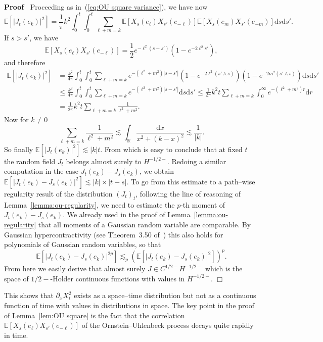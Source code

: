 \documentclass[a4paper,11pt]{article}
\newcommand{\mathd}{\mathrm{d}}
\newenvironment{proof}{\noindent\textbf{Proof\ }}{\hspace*{\fill}$\Box$\medskip}
\begin{document}
\begin{proof}
  Proceeding as in~(\ref{eq:OU square variance}), we have now
  \[ \mathbb{E} [| J_t (e_k) |^2] = \frac{1}{\pi} k^2 \int_0^t \int_0^t \sum_{\ell + m =
     k} \mathbb{E} [X_s (e_{\ell}) X_{s'} (e_{- \ell})] \mathbb{E} [X_s
     (e_m) X_{s'} (e_{- m})] \mathd s \mathd s' . \]
  If $s > s'$, we have
  \[ \mathbb{E} [X_s (e_{\ell}) X_{s'} (e_{- \ell})] = \frac{1}{2} e^{-
     \ell^2 (s - s')} (1 - e^{- 2 \ell^2 s'}), \]
  and therefore
  \begin{align*}
     \mathbb{E} [| J_t (e_k) |^2] & = \frac{k^2}{4\pi} \int_0^t \int_0^t \sum_{\ell + m = k} e^{- (\ell^2 + m^2) | s - s' |} (1 - e^{- 2 \ell^2(s' \wedge s)}) (1 - e^{- 2 m^2 (s' \wedge s)}) \mathd s \mathd s' \\
      & \leqslant \frac{k^2}{4\pi} \int_0^t \int_0^t \sum_{\ell + m = k} e^{-(\ell^2 + m^2) | s - s' |} \mathd s \mathd s' \leqslant \frac{1}{2\pi} k^2 t \sum_{\ell + m = k} \int_0^{\infty} e^{- (\ell^2 + m^2) r} \mathd r  \\
      & = \frac{1}{2\pi} k^2 t \sum_{\ell + m = k} \frac{1}{\ell^2 + m^2}.
  \end{align*}
  Now for $k \neq 0$
  \[ \sum_{\ell + m = k} \frac{1}{\ell^2 + m^2} \lesssim \int_{\mathbb{R}}
     \frac{\mathd x}{x^2 + (k - x)^2} \lesssim \frac{1}{| k |} . \]
  So finally $\mathbb{E} [| J_t (e_k) |^2] \lesssim | k | t$. From which is easy to conclude that at 
  fixed $t$ the random field $J_t$ belongs almost surely to $H^{-1/2-}$. Redoing a
  similar computation in the case $J_t (e_k) - J_s (e_k)$, we obtain
  $\mathbb{E} [| J_t (e_k) - J_s (e_k) |^2] \lesssim | k | \times | t - s |$.
  To go from this estimate to a path--wise regularity result of the
  distribution $(J_t)_t$, following the line of reasoning of
  Lemma~\ref{lemma:ou-regularity}, we need to estimate the $p$-th moment of
  $J_t (e_k) - J_s (e_k)$. We already used in the proof of Lemma~\ref{lemma:ou-regularity} that all moments of a Gaussian random variable are comparable. By Gaussian hypercontractivity (see Theorem~3.50
  of~{\cite{Janson1997}}) this also holds for polynomials of Gaussian random variables, so that
  \[ \mathbb{E} [| J_t (e_k) - J_s (e_k) |^{2 p}] \lesssim_p (\mathbb{E} [|
     J_t (e_k) - J_s (e_k) |^2])^p . \]
  From here we easily derive that almost surely $J \in C^{1 / 2 -} H^{- 1 / 2
  -}$ which is the space of $1/2-$-Holder continuous functions with values in $ H^{- 1 / 2
  -}$.
\end{proof}

This shows that $\partial_x X^2_t$ exists as a space--time distribution but
not as a continuous function of time with values in distributions in space.
The key point in the proof of Lemma~\ref{lem:OU square} is the fact that the correlation $\mathbb{E} [X_s (e_{\ell}) X_{s'} (e_{- \ell})]$ of the
Ornstein--Uhlenbeck process decays quite rapidly in time.
\end{document}
